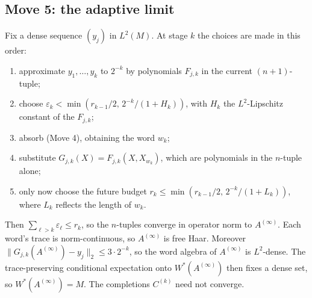 \subsection{Move 5: the adaptive limit}
Fix a dense sequence $(y_j)$ in $L^2(M)$. At stage $k$ the choices are made in this order:
\begin{enumerate}[leftmargin=*]
\item approximate $y_1,\dots,y_k$ to $2^{-k}$ by polynomials $F_{j,k}$ in the current $(n+1)$-tuple;
\item choose $\varepsilon_k<\min(r_{k-1}/2,\,2^{-k}/(1+H_k))$, with $H_k$ the $L^2$-Lipschitz constant of the $F_{j,k}$;
\item absorb (Move 4), obtaining the word $w_k$;
\item substitute $G_{j,k}(X)=F_{j,k}(X,X_{w_k})$, which are polynomials in the $n$-tuple alone;
\item only now choose the future budget $r_k\le\min(r_{k-1}/2,\,2^{-k}/(1+L_k))$, where $L_k$ reflects the length of $w_k$.
\end{enumerate}
Then $\sum_{\ell>k}\varepsilon_\ell\le r_k$, so the $n$-tuples converge in operator norm to $A^{(\infty)}$. Each word's trace is norm-continuous, so $A^{(\infty)}$ is free Haar. Moreover
$\|G_{j,k}(A^{(\infty)})-y_j\|_2\le3\cdot2^{-k}$, so the word algebra of $A^{(\infty)}$ is $L^2$-dense. The trace-preserving conditional expectation onto $W^*(A^{(\infty)})$ then fixes a dense set,
so $W^*(A^{(\infty)})=M$. The completions $C^{(k)}$ need not converge.
